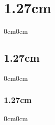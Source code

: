 \usepackage{titlesec}
\titlespacing\section{1.27cm}{0cm}{0cm}
\titlespacing\subsection{1.27cm}{0cm}{0cm}
\titlespacing\subsubsection{1.27cm}{0cm}{0cm}

\newcommand{\anonsection}[1]{
    \phantomsection
    \section*{#1}
    \addcontentsline{toc}{section}{#1}
}


\usepackage{tocloft}
\renewcommand{\cfttoctitlefont}{\hspace{0.42\textwidth}\MakeTextUppercase}
\renewcommand{\cftsecfont}{\hspace{0pt}}
\renewcommand\cftsecleader{\cftdotfill{\cftdotsep}} 
\renewcommand\cftsecpagefont{\mdseries}
\renewcommand{\contentsname}{Содержание}

\setcounter{tocdepth}{3}
\setcounter{page}{1} %

\usepackage{float}
\usepackage{amssymb} %

\usepackage{amsmath}
\DeclareMathOperator*{\argmax}{argmax} %

\makeatletter
\renewenvironment{thebibliography}[1]
    {\section*{\refname}
        \list{\@biblabel{\@arabic\c@enumiv}}
           {\settowidth\labelwidth{\@biblabel{#1}}
            \leftmargin\labelsep
            \itemindent 16.7mm
            \@openbib@code
            \usecounter{enumiv}
            \let\p@enumiv\@empty
            \renewcommand\theenumiv{\@arabic\c@enumiv}
        }
        \setlength{\itemsep}{0pt}
    }
\makeatother

